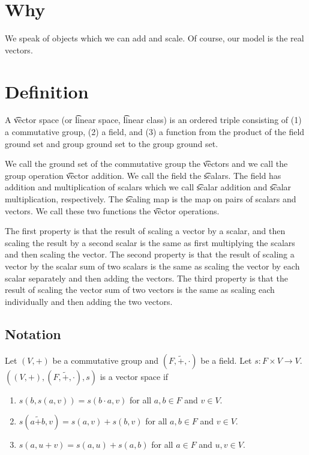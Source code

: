 
\section*{Why}

We speak of objects which we can add and scale.
Of course, our model is the real vectors.

\section*{Definition}

A \t{vector space} (or \t{linear space}, \t{linear class}) is an ordered triple consisting of (1) a commutative group, (2) a field, and (3) a function from the product of the field ground set and group ground set to the group ground set.

We call the ground set of the commutative group the \t{vectors} and we call the group operation \t{vector addition}.
We call the field the \t{scalars}.
The field has addition and multiplication of scalars which we call \t{scalar addition} and \t{scalar multiplication}, respectively.
The \t{scaling map} is the map on pairs of scalars and vectors.
We call these two functions the \t{vector operations}.

The first property is that the result of scaling a vector by a scalar, and then scaling the result by a second scalar is the same as first multiplying the scalars and then scaling the vector.
The second property is that the result of scaling a vector by the scalar sum of two scalars is the same as scaling the vector by each scalar separately and then adding the vectors.
The third property is that the result of scaling the vector sum of two vectors is the same as scaling each individually and then adding the two vectors.

\subsection*{Notation}

Let $(V,+)$ be a commutative group and $(F, \tilde{+}, \cdot)$ be a field.
Let $s: F \times  V \to V$. $((V, +), (F, \tilde{+}, \cdot), s)$ is a vector space if
  \begin{enumerate}
    \item $s(b,s(a, v)) = s(b \cdot a, v)$ for all $a, b \in F$ and $v \in V$.
    \item $s(a\tilde{+}b, v) = s(a, v) + s(b, v)$ for all $a, b \in F$ and $v \in V$.
    \item $s(a, u + v) = s(a,u) + s(a, b)$ for all $a \in F$ and $u, v \in V$.
  \end{enumerate}

